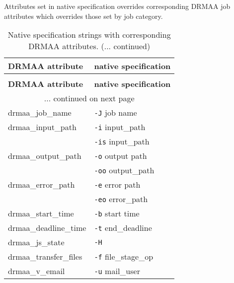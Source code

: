 \documentclass[a4paper,10pt,english]{article}
\newlength{\DUtablewidth} %
\begin{document}
Attributes set in native specification overrides corresponding DRMAA job
attributes which overrides those set by job category.

\leavevmode
\setlength{\DUtablewidth}{\linewidth}
\begin{longtable}[c]{|p{0.261\DUtablewidth}|p{0.307\DUtablewidth}|}
\caption{Native specification strings with corresponding DRMAA attributes.}\\
\hline
\textbf{%
DRMAA attribute
} & \textbf{%
native specification
} \\
\hline
\endfirsthead
\caption[]{Native specification strings with corresponding DRMAA attributes. (... continued)}\\
\hline
\textbf{%
DRMAA attribute
} & \textbf{%
native specification
} \\
\hline
\endhead
\multicolumn{2}{c}{\hfill ... continued on next page} \\
\endfoot
\endlastfoot

drmaa\_job\_name
 & 
\texttt{-J} job name
 \\
\hline

drmaa\_input\_path
 & 
\texttt{-i} input\_path
 \\
\hline

% 
 & 
\texttt{-is} input\_path
 \\
\hline

drmaa\_output\_path
 & 
\texttt{-o} output path
 \\
\hline

% 
 & 
\texttt{-oo} output\_path
 \\
\hline

drmaa\_error\_path
 & 
\texttt{-e} error path
 \\
\hline

% 
 & 
\texttt{-eo} error\_path
 \\
\hline

drmaa\_start\_time
 & 
\texttt{-b} start time
 \\
\hline

drmaa\_deadline\_time
 & 
\texttt{-t} end\_deadline
 \\
\hline

drmaa\_js\_state
 & 
\texttt{-H}
 \\
\hline

drmaa\_transfer\_files
 & 
\texttt{-f} file\_stage\_op
 \\
\hline

drmaa\_v\_email
 & 
\texttt{-u} mail\_user
 \\
\hline


\end{longtable}
\end{document}
